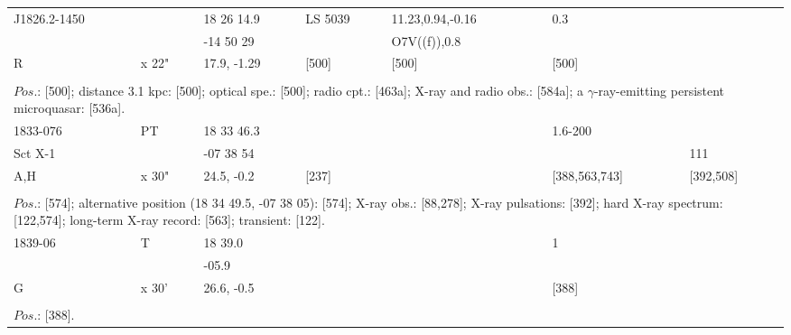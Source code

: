 \documentclass{aa}
\begin{document}
\begin{table*}[h]
\begin{tabular}{p{2.5cm}p{1cm}p{1.8cm}p{2.3cm}p{3.3cm}p{2.0cm}p{2.2cm}}
\noalign{\smallskip}
\hline
\noalign{\smallskip}
J1826.2-1450   &                  &  18 26 14.9 & LS 5039    &    11.23,0.94,-0.16 & 0.3          &     \\
                            &                  & -14 50 29    &                    &    O7V((f)),0.8         &                &    \\
R                         &     x 22"    & 17.9, -1.29  &    [500]      &             [500]          &  [500]       &    \\
  
\\
\multicolumn{7}{p{17.5cm}}{
$Pos$.: [500]; distance 3.1 kpc: [500]; optical spe.: [500]; radio cpt.: [463a]; X-ray and radio obs.: [584a]; 
a $\gamma$-ray-emitting persistent microquasar: [536a].        }\\

\noalign{\smallskip}
\hline
\noalign{\smallskip}
 1833-076     &  PT      & 18 33 46.3     &                          &                      & 1.6-200                 &                        \\
 Sct X-1        &              & -07 38 54       &                          &                      &                                & 111         \\
A,H                & x 30"   & 24.5, -0.2        &     [237]           &                      &  [388,563,743]    &  [392,508]  \\
\\
\multicolumn{7}{p{17.5cm}}{
$Pos$.: [574]; alternative position (18 34 49.5, -07 38 05): [574]; X-ray obs.: [88,278]; X-ray pulsations: [392]; 
hard X-ray spectrum: [122,574]; long-term X-ray record: [563]; transient: [122]. }\\

\noalign{\smallskip}
\hline
\noalign{\smallskip}
 1839-06      &  T         & 18 39.0        &                    &                      & 1                 &                        \\
                      &             & -05.9            &                     &                      &                    &          \\
G                   & x 30'    & 26.6, -0.5    &                     &                      & [388]          &   \\
\\
\multicolumn{7}{p{17.5cm}}{
$Pos$.: [388]. }\\


\end{tabular}
\end{table*}
\end{document}
